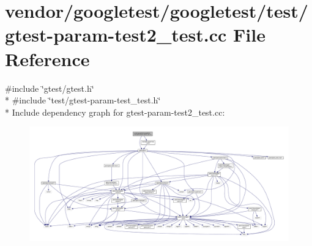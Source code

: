 \hypertarget{gtest-param-test2__test_8cc}{}\section{vendor/googletest/googletest/test/gtest-\/param-\/test2\+\_\+test.cc File Reference}
\label{gtest-param-test2__test_8cc}
{\ttfamily \#include \char`\"{}gtest/gtest.\+h\char`\"{}}\\*
{\ttfamily \#include \char`\"{}test/gtest-\/param-\/test\+\_\+test.\+h\char`\"{}}\\*
Include dependency graph for gtest-\/param-\/test2\+\_\+test.cc\+:\nopagebreak
\begin{figure}[H]
\begin{center}
\leavevmode
\includegraphics[width=350pt]{gtest-param-test2__test_8cc__incl}
\end{center}
\end{figure}
